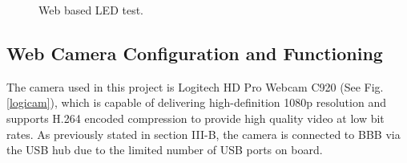 \documentclass[12pt,journal,draftclsnofoot,onecolumn]{IEEEtran}
\begin{document}
\begin{figure}[ht]
	\centering
	
	\caption{Web based LED test.}\label{LEDTest}
\end{figure}

\subsection{Web Camera Configuration and Functioning}\label{Webcam}
The camera used in this project is Logitech HD Pro Webcam C920 \cite{logicam} (See Fig.\ref{logicam}), which is capable of delivering high-definition 1080p resolution and supports H.264 encoded compression to provide high quality video at low bit rates. As previously stated in section III-B, the camera is connected to BBB via the USB hub due to the limited number of USB ports on board.
\end{document}
